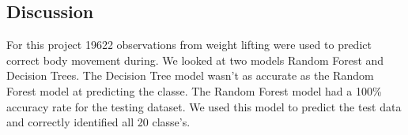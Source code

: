 \documentclass[
]{article}
\begin{document}
\hypertarget{discussion}{%
\subsection{Discussion}\label{discussion}}

For this project 19622 observations from weight lifting were used to
predict correct body movement during. We looked at two models Random
Forest and Decision Trees. The Decision Tree model wasn't as accurate as
the Random Forest model at predicting the classe. The Random Forest
model had a 100\% accuracy rate for the testing dataset. We used this
model to predict the test data and correctly identified all 20 classe's.
\end{document}
